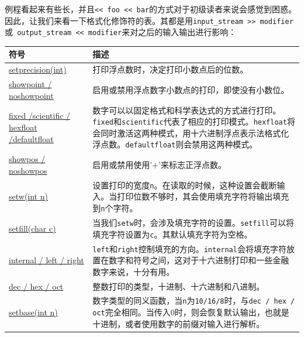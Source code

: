
例程看起来有些长，并且\texttt{<< foo << bar}的方式对于初级读者来说会感觉到困惑。因此，让我们来看一下格式化修饰符的表。其都是用\texttt{input\_stream >> modifier }或\texttt{ output\_stream << modifier}来对之后的输入输出进行影响：

\begin{table}[htbp]\centering
\begin{tabularx}{\textwidth}{XX}
\toprule
符号 & 描述 \\
\midrule
\href{http://zh.cppreference.com/w/cpp/io/manip/setprecision}{setprecision(int)} & 打印浮点数时，决定打印小数点后的位数。 \\
\href{http://zh.cppreference.com/w/cpp/io/manip/showpoint}{showpoint / noshowpoint} & 启用或禁用浮点数字小数点的打印，即使没有小数位。 \\
\href{http://zh.cppreference.com/w/cpp/io/manip/fixed}{fixed /scientific / hexfloat /defaultfloat} & 数字可以以固定格式和科学表达式的方式进行打印。\texttt{fixed}和\texttt{scientific}代表了相应的打印模式。\texttt{hexfloat}将会同时激活这两种模式，用十六进制浮点表示法格式化浮点数。\texttt{defaultfloat}则会禁用这两种模式。 \\
\href{http://zh.cppreference.com/w/cpp/io/manip/showpos}{showpos / noshowpos} & 启用或禁用使用'+'来标志正浮点数。 \\
\href{http://zh.cppreference.com/w/cpp/io/manip/setw}{setw(int n)} & 设置打印的宽度\texttt{n}。在读取的时候，这种设置会截断输入。当打印位数不够时，其会使用填充字符将输出填充到\texttt{n}个字符。 \\
\href{http://zh.cppreference.com/w/cpp/io/manip/setfill}{setfill(char c)} & 当我们\texttt{setw}时，会涉及填充字符的设置。\texttt{setfill}可以将填充字符设置为\texttt{c}。其默认填充字符为空格。 \\
\href{http://zh.cppreference.com/w/cpp/io/manip/left}{internal / left / right} & \texttt{left}和\texttt{right}控制填充的方向。\texttt{internal}会将填充字符放置在数字和符号之间，这对于十六进制打印和一些金融数字来说，十分有用。 \\
\href{http://zh.cppreference.com/w/cpp/io/manip/hex}{dec / hex / oct} & 整数打印的类型，十进制、十六进制和八进制。 \\
\href{http://zh.cppreference.com/w/cpp/io/manip/setbase}{setbase(int n)} & 数字类型的同义函数，当\texttt{n}为\texttt{10/16/8}时，与\texttt{dec / hex / oct}完全相同。当传入0时，则会恢复默认输出，也就是十进制，或者使用数字的前缀对输入进行解析。 \\

\end{tabularx}
\end{table}
